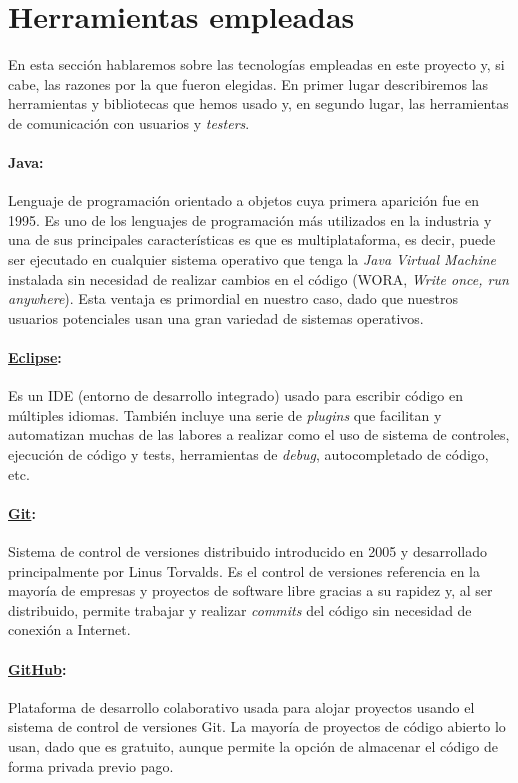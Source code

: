 \section{Herramientas empleadas}

En esta sección hablaremos sobre las tecnologías empleadas en este proyecto y, si cabe, las razones por la que fueron elegidas. En primer lugar describiremos las herramientas y bibliotecas que hemos usado y, en segundo lugar, las herramientas de comunicación con usuarios y \textit{testers}.

\paragraph{Java:} Lenguaje de programación orientado a objetos cuya primera aparición fue en 1995. Es uno de los lenguajes de programación más utilizados en la industria y una de sus principales características es que es multiplataforma, es decir, puede ser ejecutado en cualquier sistema operativo que tenga la \textit{Java Virtual Machine} instalada sin necesidad de realizar cambios en el código (WORA, \textit{Write once, run anywhere}). Esta ventaja es primordial en nuestro caso, dado que nuestros usuarios potenciales usan una gran variedad de sistemas operativos.

 \paragraph{\href{https://eclipse.org}{Eclipse}:} Es un IDE (entorno de desarrollo integrado) usado para escribir código en múltiples idiomas. También incluye una serie de \textit{plugins} que facilitan y automatizan muchas de las labores a realizar como el uso de sistema de controles, ejecución de código y tests, herramientas de \textit{debug}, autocompletado de código, etc.

 \paragraph{\href{https://goo.gl/IKsKt5}{Git}:} Sistema de control de versiones distribuido introducido en 2005 y desarrollado principalmente por Linus Torvalds. Es el control de versiones referencia en la mayoría de empresas y proyectos de software libre gracias a su rapidez y, al ser distribuido, permite trabajar y realizar \textit{commits} del código sin necesidad de conexión a Internet.

 \paragraph{\href{github.com}{GitHub}:} Plataforma de desarrollo colaborativo usada para alojar proyectos usando el sistema de control de versiones Git. La mayoría de proyectos de código abierto lo usan, dado que es gratuito, aunque permite la opción de almacenar el código de forma privada previo pago.

